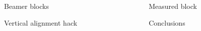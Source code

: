 
\begin{columns}[t]
  \begin{column}[t]{\wcolA}
    \begin{myBox}[\hboxOneA]{Beamer blocks}
      
    \end{myBox}
    \vspace{\vblocksep}  
    \begin{myBox}[\hboxTwoA]{Vertical alignment hack}
      
    \end{myBox}
  
  \end{column}
  
  \newlength{\wcolB}
  \setlength{\wcolB}{\dimexpr \wcols-\wcolA \relax} 
  
    \begin{column}[t]{\wcolB}
    \newlength{\hboxOneB}
     \newsavebox\myMeasuringBox
      \savebox{\myMeasuringBox}{
      \begin{myMiniPage}%
        
      \end{myMiniPage}%
    }
      \setlength{\hboxOneB}{\ht\myMeasuringBox}%
      \addtolength{\hboxOneB}{\dp\myMeasuringBox}%

    \newlength{\hboxTwoB}
    \setlength{\hboxTwoB}{ \dimexpr ( \hcols - \hboxOneB) \relax}
    
    \begin{myBox}[\hboxOneB]{Measured block}
      \usebox{\myMeasuringBox}
    \end{myBox}
    \vspace{\vblocksep}  
    \begin{myBox}[\hboxTwoB]{Conclusions}
      
    \end{myBox}
  \end{column}
\end{columns}
